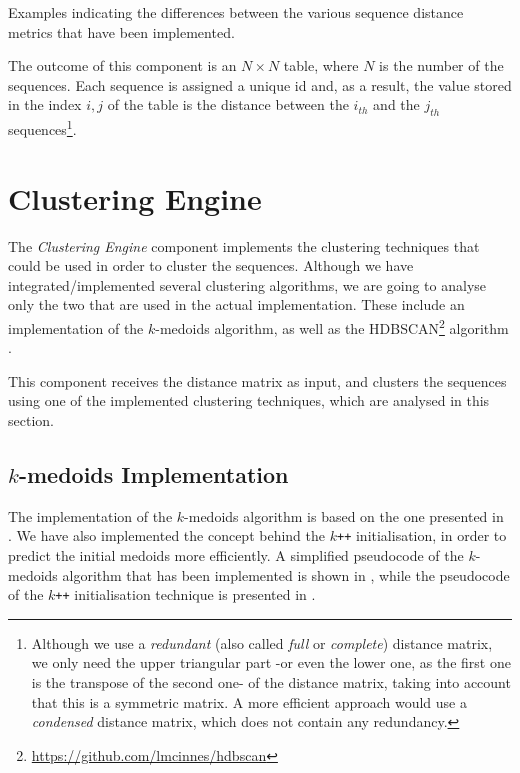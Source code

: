 \begin{table}[ht]
\centering
\small
\caption[Sequence distance metrics examples]{Examples indicating the differences between the various sequence distance metrics that have been implemented.}
\label{tables:sequence-similarity}

\end{table}

The outcome of this component is an $N\times N$ table, where $N$ is the number of the sequences. Each sequence is assigned a unique id and, as a result, the value stored in the index $i,j$ of the table is the distance between the $i_{th}$ and the $j_{th}$ sequences\footnote{Although we use a \textit{redundant} (also called \textit{full} or \textit{complete}) distance matrix, we only need the upper triangular part -or even the lower one, as the first one is the transpose of the second one- of the distance matrix, taking into account that this is a symmetric matrix. A more efficient approach would use a \textit{condensed} distance matrix, which does not contain any redundancy.}.


\section{Clustering Engine}
\label{sec:clustering-engine}

The \textit{Clustering Engine} component implements the clustering techniques that could be used in order to cluster the sequences. Although we have integrated/implemented several clustering algorithms, we are going to analyse only the two that are used in the actual implementation. These include an implementation of the $k$-medoids algorithm, as well as the HDBSCAN\footnote{\url{https://github.com/lmcinnes/hdbscan}} algorithm \cite{Campello:2013}.

This component receives the distance matrix as input, and clusters the sequences using one of the implemented clustering techniques, which are analysed in this section.


\subsection{\texorpdfstring{$k$}{k}-medoids Implementation}
\label{subsec:k-medoids-implementation}

The implementation of the $k$-medoids algorithm is based on the one presented in \cite{Bauckhage:2015}. We have also implemented the concept behind the $k$\verb!++! initialisation, in order to predict the initial medoids more efficiently. A simplified pseudocode of the $k$-medoids algorithm that has been implemented is shown in , while the pseudocode of the $k$\verb!++! initialisation technique is presented in .

